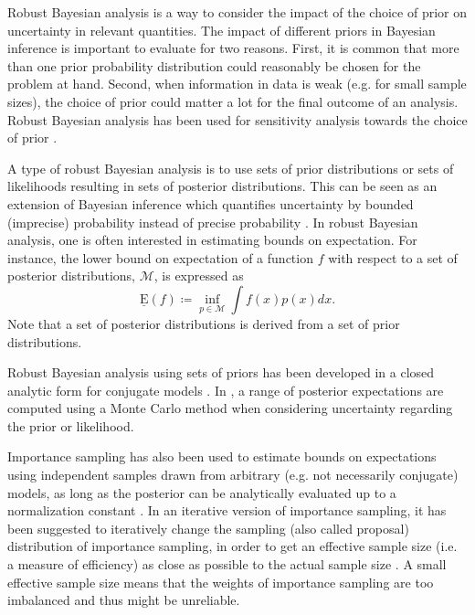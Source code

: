 \documentclass{amsart}
\theoremstyle{plain}%
\begin{document}
Robust Bayesian analysis is a way to consider the impact of the choice of prior on uncertainty 
in relevant quantities. The impact of different priors in Bayesian inference is important to evaluate for two reasons. First, it is common that more than one prior probability distribution could reasonably be chosen for the problem at hand. Second, when information in data is weak (e.g. for small sample sizes), the choice of prior could matter a lot for the final outcome of an analysis.
Robust Bayesian analysis has been used for sensitivity analysis towards the choice of prior \citep{Berger_1990}. 

A type of robust Bayesian analysis is to use sets of prior distributions or sets of likelihoods resulting in sets of posterior distributions. This can be seen as an extension of Bayesian inference which quantifies uncertainty by bounded (imprecise) probability
instead of precise probability \citep{Walley_1991}.  
In robust Bayesian analysis, one is often interested in estimating bounds on expectation.  For instance, the lower bound on expectation of a function $f$ with respect to a set of posterior distributions, $\mathcal{M}$, is expressed as
\begin{equation}
\underline{\mathrm{E}}(f) \coloneqq \displaystyle \inf_{p \in \mathcal{M}} \int f(x)p(x) dx. \label{LowerExpectation}
\end{equation}
Note that a set of posterior distributions is derived from a set of prior distributions.  

Robust Bayesian analysis using sets of priors has been developed in a closed analytic form for conjugate models \citep{Bernard_2005, Quaeghebeur_2005, Walley_1996}. 
In \citep{Wei_2017}, a range of posterior expectations 
are computed using a Monte Carlo method when considering uncertainty regarding the prior or likelihood.

Importance sampling has also been used to estimate bounds on expectations using independent samples drawn from arbitrary (e.g. not necessarily 
conjugate) models, as long as the posterior can be analytically evaluated up to a 
normalization constant \citep{Fetz_2017, Troffaes_2017, Troffaes_2018, Fetz_2018}.
In an iterative version of importance sampling, it has been suggested to iteratively change the sampling (also called proposal) distribution 
of importance sampling, in order to get an effective sample size (i.e. a measure of efficiency) as close as possible to the actual sample size \citep{Troffaes_2017, Troffaes_2018}. 
A small effective sample size means that the weights of importance sampling  are too imbalanced and thus might be unreliable.
\end{document}
